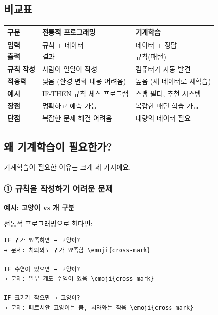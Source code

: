 \documentclass[a4paper, 11pt]{article}
\begin{document}
\hypertarget{uxbe44uxad50uxd45c}{%
\subsection{비교표}\label{uxbe44uxad50uxd45c}}

\begin{longtable}{p{4.5cm}p{4.5cm}p{5.0cm}}
\toprule\noalign{}
\textbf{구분} & \textbf{전통적 프로그래밍} & \textbf{기계학습} \\
\midrule\noalign{}
\endhead
\bottomrule\noalign{}
\endlastfoot
\textbf{입력} & 규칙 + 데이터 & 데이터 + 정답 \\
\textbf{출력} & 결과 & 규칙(패턴) \\
\textbf{규칙 작성} & 사람이 일일이 작성 & 컴퓨터가 자동 발견 \\
\textbf{적응력} & 낮음 (환경 변화 대응 어려움) & 높음 (새 데이터로
재학습) \\
\textbf{예시} & IF-THEN 규칙 체스 프로그램 & 스팸 필터, 추천 시스템 \\
\textbf{장점} & 명확하고 예측 가능 & 복잡한 패턴 학습 가능 \\
\textbf{단점} & 복잡한 문제 해결 어려움 & 대량의 데이터 필요 \\
\end{longtable}

\hypertarget{uxc65c-uxae30uxacc4uxd559uxc2b5uxc774-uxd544uxc694uxd55cuxac00}{%
\subsection{왜 기계학습이
필요한가?}\label{uxc65c-uxae30uxacc4uxd559uxc2b5uxc774-uxd544uxc694uxd55cuxac00}}

기계학습이 필요한 이유는 크게 세 가지예요.

\hypertarget{uxaddcuxce59uxc744-uxc791uxc131uxd558uxae30-uxc5b4uxb824uxc6b4-uxbb38uxc81c}{%
\subsubsection{\textbf{①} 규칙을 작성하기 어려운
문제}\label{uxaddcuxce59uxc744-uxc791uxc131uxd558uxae30-uxc5b4uxb824uxc6b4-uxbb38uxc81c}}

\textbf{예시: 고양이 vs 개 구분}

전통적 프로그래밍으로 한다면:

\begin{verbatim}
IF 귀가 뾰족하면 → 고양이?
→ 문제: 치와와도 귀가 뾰족함 \emoji{cross-mark}

IF 수염이 있으면 → 고양이?
→ 문제: 일부 개도 수염이 있음 \emoji{cross-mark}

IF 크기가 작으면 → 고양이?
→ 문제: 페르시안 고양이는 큼, 치와와는 작음 \emoji{cross-mark}
\end{verbatim}
\end{document}
